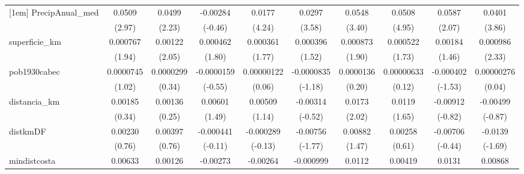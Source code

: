 {\begin{tabular}{l*{9}{c}}
[1em]
PrecipAnual\_med&      0.0509\sym{**} &      0.0499\sym{*}  &    -0.00284         &      0.0177\sym{***}&      0.0297\sym{***}&      0.0548\sym{***}&      0.0508\sym{***}&      0.0587\sym{*}  &      0.0401\sym{***}\\
            &      (2.97)         &      (2.23)         &     (-0.46)         &      (4.24)         &      (3.58)         &      (3.40)         &      (4.95)         &      (2.07)         &      (3.86)         \\
[1em]
superficie\_km&    0.000767         &     0.00122\sym{*}  &    0.000462         &    0.000361         &    0.000396         &    0.000873         &    0.000522         &     0.00184         &    0.000986\sym{*}  \\
            &      (1.94)         &      (2.05)         &      (1.80)         &      (1.77)         &      (1.52)         &      (1.90)         &      (1.73)         &      (1.46)         &      (2.33)         \\
[1em]
pob1930cabec&   0.0000745         &   0.0000299         &  -0.0000159         &  0.00000122         &  -0.0000835         &   0.0000136         &  0.00000633         &   -0.000402         &  0.00000276         \\
            &      (1.02)         &      (0.34)         &     (-0.55)         &      (0.06)         &     (-1.18)         &      (0.20)         &      (0.12)         &     (-1.53)         &      (0.04)         \\
[1em]
distancia\_km&     0.00185         &     0.00136         &     0.00601         &     0.00509         &    -0.00314         &      0.0173\sym{*}  &      0.0119         &    -0.00912         &    -0.00499         \\
            &      (0.34)         &      (0.25)         &      (1.49)         &      (1.14)         &     (-0.52)         &      (2.02)         &      (1.65)         &     (-0.82)         &     (-0.87)         \\
[1em]
distkmDF    &     0.00230         &     0.00397         &   -0.000441         &   -0.000289         &    -0.00756         &     0.00882         &     0.00258         &    -0.00706         &     -0.0139         \\
            &      (0.76)         &      (0.76)         &     (-0.11)         &     (-0.13)         &     (-1.77)         &      (1.47)         &      (0.61)         &     (-0.44)         &     (-1.69)         \\
[1em]
mindistcosta&     0.00633         &     0.00126         &    -0.00273         &    -0.00264         &   -0.000999         &      0.0112         &     0.00419         &      0.0131         &     0.00868         \\

\end{tabular}}
